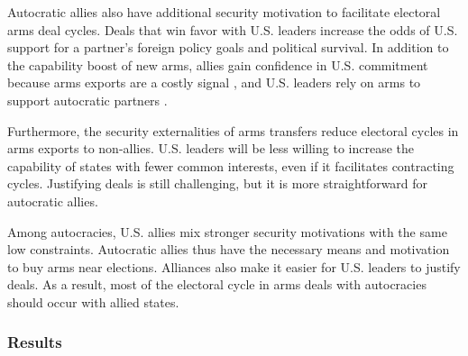 \documentclass[12pt]{article}
\begin{document}
Autocratic allies also have additional security motivation to facilitate electoral arms deal cycles. 
Deals that win favor with U.S. leaders increase the odds of U.S. support for a partner's foreign policy goals and political survival.  
In addition to the capability boost of new arms, allies gain confidence in U.S. commitment because arms exports are a costly signal \citep{McManusYarhi-Milo2017}, and U.S. leaders rely on arms to support autocratic partners \citep{Yarhi-Miloetal2016}.


Furthermore, the security externalities of arms transfers reduce electoral cycles in arms exports to non-allies. 
U.S. leaders will be less willing to increase the capability of states with fewer common interests, even if it facilitates contracting cycles.
Justifying deals is still challenging, but it is more straightforward for autocratic allies. 







Among autocracies, U.S. allies mix stronger security motivations with the same low constraints. 
Autocratic allies thus have the necessary means and motivation to buy arms near elections. 
Alliances also make it easier for U.S. leaders to justify deals.
As a result, most of the electoral cycle in arms deals with autocracies should occur with allied states. 
 

 
\subsubsection{Results}
\end{document}
